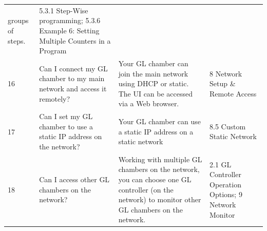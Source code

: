\begin{longtable}[]{@{}llll@{}}
\begin{minipage}[t]{0.33\columnwidth}
groups of steps.\strut
\end{minipage} & \begin{minipage}[t]{0.17\columnwidth}\raggedright
5.3.1 Step-Wise programming; 5.3.6 Example 6: Setting Multiple Counters
in a Program\strut
\end{minipage}\tabularnewline
\begin{minipage}[t]{0.08\columnwidth}\raggedright
16\strut
\end{minipage} & \begin{minipage}[t]{0.30\columnwidth}\raggedright
Can I connect my GL chamber to my main network and access it
remotely?\strut
\end{minipage} & \begin{minipage}[t]{0.33\columnwidth}\raggedright
Your GL chamber can join the main network using DHCP or static. The UI
can be accessed via a Web browser.\strut
\end{minipage} & \begin{minipage}[t]{0.17\columnwidth}\raggedright
8 Network Setup \& Remote Access\strut
\end{minipage}\tabularnewline
\begin{minipage}[t]{0.08\columnwidth}\raggedright
17\strut
\end{minipage} & \begin{minipage}[t]{0.30\columnwidth}\raggedright
Can I set my GL chamber to use a static IP address on the network?\strut
\end{minipage} & \begin{minipage}[t]{0.33\columnwidth}\raggedright
Your GL chamber can use a static IP address on a static network\strut
\end{minipage} & \begin{minipage}[t]{0.17\columnwidth}\raggedright
8.5 Custom Static Network\strut
\end{minipage}\tabularnewline
\begin{minipage}[t]{0.08\columnwidth}\raggedright
18\strut
\end{minipage} & \begin{minipage}[t]{0.30\columnwidth}\raggedright
Can I access other GL chambers on the network?\strut
\end{minipage} & \begin{minipage}[t]{0.33\columnwidth}\raggedright
Working with multiple GL chambers on the network, you can choose one GL
controller (on the network) to monitor other GL chambers on the
network.\strut
\end{minipage} & \begin{minipage}[t]{0.17\columnwidth}\raggedright
2.1 GL Controller Operation Options; 9 Network Monitor\strut
\end{minipage}\tabularnewline
\bottomrule
\end{longtable}


